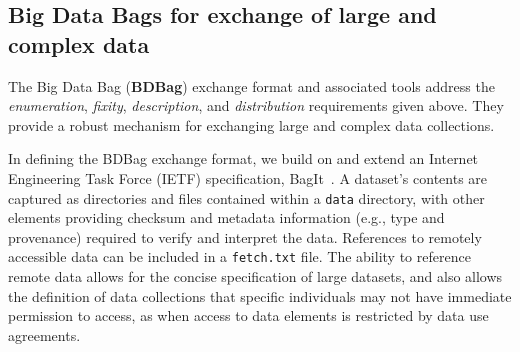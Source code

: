 \documentclass[11pt]{article}
\begin{document}

\subsection{Big Data Bags for exchange of large and complex data}

The Big Data Bag (\textbf{BDBag}) exchange format and associated tools address the \emph{enumeration}, \emph{fixity}, \emph{description}, and \emph{distribution} requirements given above.
They provide a robust mechanism for exchanging large and complex data collections.

In defining the BDBag exchange format, 
we build on and extend an Internet Engineering Task Force (IETF) specification, BagIt~\cite{Kunze2015}.
A dataset's contents are captured as
directories and files contained within a \texttt{data} directory,
with other elements providing checksum and metadata information (e.g., type and provenance)
required to verify and interpret the data.
References to remotely accessible data can be included in a \texttt{fetch.txt} file. 
The ability to reference remote data allows for the concise specification of large datasets, and
also allows the definition of data collections that specific individuals may not have immediate permission to access, 
as when access to data elements is restricted by data use agreements.
\end{document}

